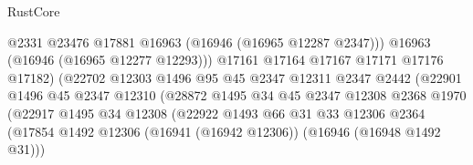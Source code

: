 \begin{lexlean}{RustCore}
\begin{coremodule}
                                            @2331
                                            @23476
                                            @17881
                                            @16963
                                            (@16946 (@16965 @12287 @2347)))
                                          @16963
                                          (@16946 (@16965 @12277 @12293)))
                                        @17161
                                        @17164
                                        @17167
                                        @17171
                                        @17176
                                        @17182)
                                      (@22702
                                        @12303
                                        @1496
                                        @95
                                        @45
                                        @2347
                                        @12311
                                        @2347
                                        @2442
                                        (@22901
                                          @1496
                                          @45
                                          @2347
                                          @12310
                                          (@28872
                                            @1495
                                            @34
                                            @45
                                            @2347
                                            @12308
                                            @2368
                                            @1970
                                            (@22917
                                              @1495
                                              @34
                                              @12308
                                              (@22922
                                                @1493
                                                @66
                                                @31
                                                @33
                                                @12306
                                                @2364
                                                (@17854
                                                  @1492
                                                  @12306
                                                  (@16941 (@16942 @12306))
                                                  (@16946 (@16948 @1492 @31)))

\end{coremodule}
\end{lexlean}
